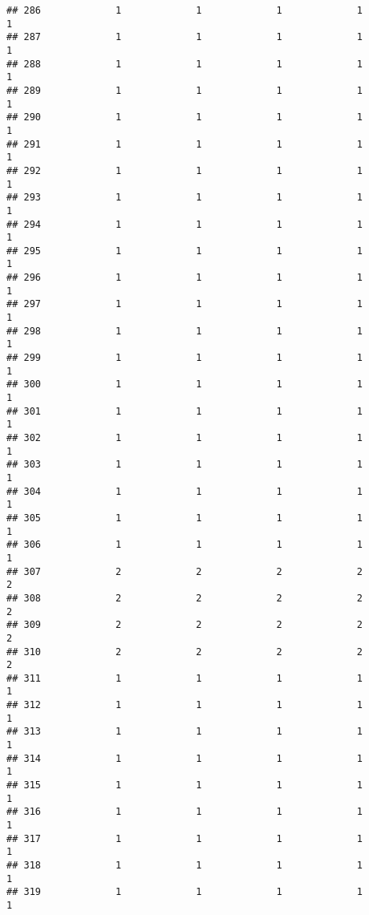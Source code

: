 \documentclass[
]{article}
\begin{document}
\begin{verbatim}
## 286             1             1             1             1             1
## 287             1             1             1             1             1
## 288             1             1             1             1             1
## 289             1             1             1             1             1
## 290             1             1             1             1             1
## 291             1             1             1             1             1
## 292             1             1             1             1             1
## 293             1             1             1             1             1
## 294             1             1             1             1             1
## 295             1             1             1             1             1
## 296             1             1             1             1             1
## 297             1             1             1             1             1
## 298             1             1             1             1             1
## 299             1             1             1             1             1
## 300             1             1             1             1             1
## 301             1             1             1             1             1
## 302             1             1             1             1             1
## 303             1             1             1             1             1
## 304             1             1             1             1             1
## 305             1             1             1             1             1
## 306             1             1             1             1             1
## 307             2             2             2             2             2
## 308             2             2             2             2             2
## 309             2             2             2             2             2
## 310             2             2             2             2             2
## 311             1             1             1             1             1
## 312             1             1             1             1             1
## 313             1             1             1             1             1
## 314             1             1             1             1             1
## 315             1             1             1             1             1
## 316             1             1             1             1             1
## 317             1             1             1             1             1
## 318             1             1             1             1             1
## 319             1             1             1             1             1

\end{verbatim}
\end{document}
